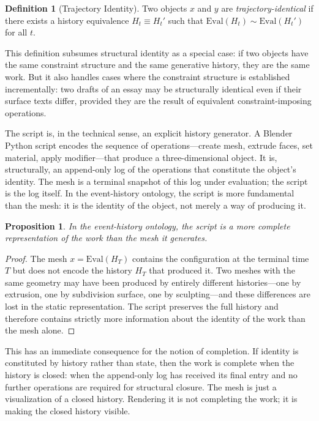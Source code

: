 \documentclass[11pt, twoside]{article}
\theoremstyle{plain}
\newtheorem{proposition}[theorem]{Proposition}
\theoremstyle{definition}
\newtheorem{definition}[theorem]{Definition}
\theoremstyle{remark}
\begin{document}
\begin{definition}[Trajectory Identity]
Two objects $x$ and $y$ are \emph{trajectory-identical} if there exists a history equivalence $H_t \equiv H_t'$ such that $\text{Eval}(H_t) \sim \text{Eval}(H_t')$ for all $t$.
\end{definition}

This definition subsumes structural identity as a special case: if two objects have the same constraint structure and the same generative history, they are the same work. But it also handles cases where the constraint structure is established incrementally: two drafts of an essay may be structurally identical even if their surface texts differ, provided they are the result of equivalent constraint-imposing operations.

The script is, in the technical sense, an explicit history generator. A Blender Python script encodes the sequence of operations---create mesh, extrude faces, set material, apply modifier---that produce a three-dimensional object. It is, structurally, an append-only log of the operations that constitute the object's identity. The mesh is a terminal snapshot of this log under evaluation; the script is the log itself. In the event-history ontology, the script is more fundamental than the mesh: it is the identity of the object, not merely a way of producing it.

\begin{proposition}
\label{prop:script-primacy}
In the event-history ontology, the script is a more complete representation of the work than the mesh it generates.
\end{proposition}

\begin{proof}
The mesh $x = \text{Eval}(H_T)$ contains the configuration at the terminal time $T$ but does not encode the history $H_T$ that produced it. Two meshes with the same geometry may have been produced by entirely different histories---one by extrusion, one by subdivision surface, one by sculpting---and these differences are lost in the static representation. The script preserves the full history and therefore contains strictly more information about the identity of the work than the mesh alone.
\end{proof}

This has an immediate consequence for the notion of completion. If identity is constituted by history rather than state, then the work is complete when the history is closed: when the append-only log has received its final entry and no further operations are required for structural closure. The mesh is just a visualization of a closed history. Rendering it is not completing the work; it is making the closed history visible.
\end{document}
